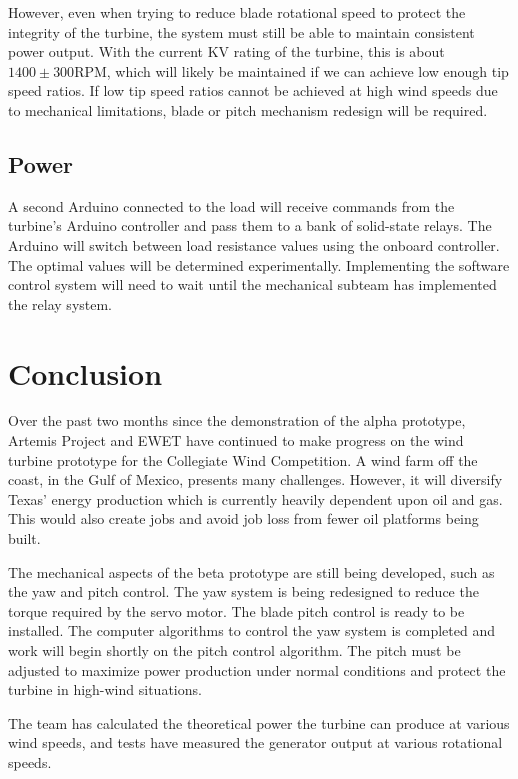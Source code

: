 \documentclass[11pt,letterpaper,conference]{IEEEtran}
\begin{document}
However, even when trying to reduce blade rotational speed to protect the
integrity of the turbine, the system must still be able to maintain
consistent power output. With the current KV rating of the turbine, this is
about $1400 \pm 300$\;RPM, which will likely be maintained if we can achieve
low enough tip speed ratios. If low tip speed ratios cannot be achieved
at high wind speeds due to mechanical limitations, blade or
pitch mechanism redesign will be required.


\subsection{Power}

A second Arduino connected to the load will receive commands from the turbine's
Arduino controller and pass them to a bank of solid-state relays. The
Arduino will switch between load resistance values using the onboard
controller. The optimal values will be determined experimentally. Implementing
the software control system will need to wait until the mechanical subteam has
implemented the relay system.

\section{Conclusion}

Over the past two months since the demonstration of the alpha prototype, Artemis Project and EWET have continued to make progress on the wind turbine prototype for the Collegiate Wind Competition. A wind farm off the coast, in the Gulf of Mexico, presents many challenges. However, it will diversify Texas' energy production which is currently heavily dependent upon oil and gas. This would also create jobs and avoid job loss from fewer oil platforms being built.

The mechanical aspects of the beta prototype are still being developed, such as the yaw and pitch control. The yaw system is being redesigned to reduce the torque required by the servo motor. The blade pitch control is ready to be installed. The computer algorithms to control the yaw system is completed and work will begin shortly on the pitch control algorithm. The pitch must be adjusted to maximize power production under normal conditions and protect the turbine in high-wind situations.

The team has calculated the theoretical power the turbine can produce at various wind speeds, and tests have measured the generator output at various rotational speeds.
\end{document}
